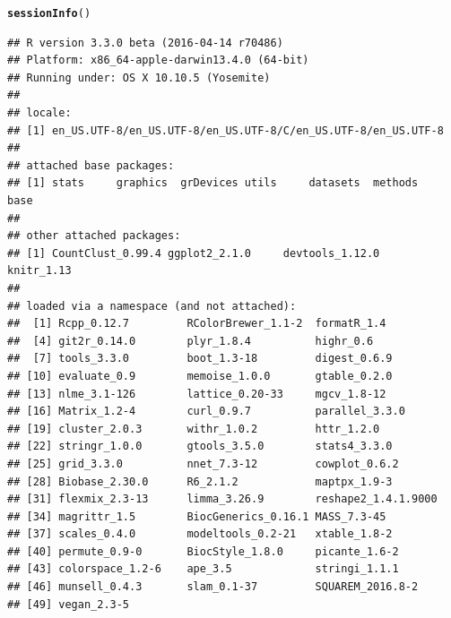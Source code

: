 \documentclass[12pt]{article}\usepackage[]{graphicx}\usepackage[usenames,dvipsnames]{color}
\makeatletter
\newcommand{\hlstd}[1]{\textcolor[rgb]{0.345,0.345,0.345}{#1}}%
\newcommand{\hlkwd}[1]{\textcolor[rgb]{0.737,0.353,0.396}{\textbf{#1}}}%
\newenvironment{kframe}{%
 \def\at@end@of@kframe{}%
 \ifinner\ifhmode%
  \def\at@end@of@kframe{\end{minipage}}%
  \begin{minipage}{\columnwidth}%
 \fi\fi%
 \def\FrameCommand##1{\hskip\@totalleftmargin \hskip-\fboxsep
 \colorbox{shadecolor}{##1}\hskip-\fboxsep
     \hskip-\linewidth \hskip-\@totalleftmargin \hskip\columnwidth}%
 \MakeFramed {\advance\hsize-\width
   \@totalleftmargin\z@ \linewidth\hsize
   \@setminipage}}%
 {\par\unskip\endMakeFramed%
 \at@end@of@kframe}
\newenvironment{knitrout}{}{} %
\makeatother
\begin{document}
\begin{knitrout}
\color{fgcolor}\begin{kframe}
\begin{alltt}
\hlkwd{sessionInfo}\hlstd{()}
\end{alltt}
\begin{verbatim}
## R version 3.3.0 beta (2016-04-14 r70486)
## Platform: x86_64-apple-darwin13.4.0 (64-bit)
## Running under: OS X 10.10.5 (Yosemite)
## 
## locale:
## [1] en_US.UTF-8/en_US.UTF-8/en_US.UTF-8/C/en_US.UTF-8/en_US.UTF-8
## 
## attached base packages:
## [1] stats     graphics  grDevices utils     datasets  methods   base     
## 
## other attached packages:
## [1] CountClust_0.99.4 ggplot2_2.1.0     devtools_1.12.0   knitr_1.13       
## 
## loaded via a namespace (and not attached):
##  [1] Rcpp_0.12.7         RColorBrewer_1.1-2  formatR_1.4        
##  [4] git2r_0.14.0        plyr_1.8.4          highr_0.6          
##  [7] tools_3.3.0         boot_1.3-18         digest_0.6.9       
## [10] evaluate_0.9        memoise_1.0.0       gtable_0.2.0       
## [13] nlme_3.1-126        lattice_0.20-33     mgcv_1.8-12        
## [16] Matrix_1.2-4        curl_0.9.7          parallel_3.3.0     
## [19] cluster_2.0.3       withr_1.0.2         httr_1.2.0         
## [22] stringr_1.0.0       gtools_3.5.0        stats4_3.3.0       
## [25] grid_3.3.0          nnet_7.3-12         cowplot_0.6.2      
## [28] Biobase_2.30.0      R6_2.1.2            maptpx_1.9-3       
## [31] flexmix_2.3-13      limma_3.26.9        reshape2_1.4.1.9000
## [34] magrittr_1.5        BiocGenerics_0.16.1 MASS_7.3-45        
## [37] scales_0.4.0        modeltools_0.2-21   xtable_1.8-2       
## [40] permute_0.9-0       BiocStyle_1.8.0     picante_1.6-2      
## [43] colorspace_1.2-6    ape_3.5             stringi_1.1.1      
## [46] munsell_0.4.3       slam_0.1-37         SQUAREM_2016.8-2   
## [49] vegan_2.3-5
\end{verbatim}
\end{kframe}
\end{knitrout}
\end{document}
